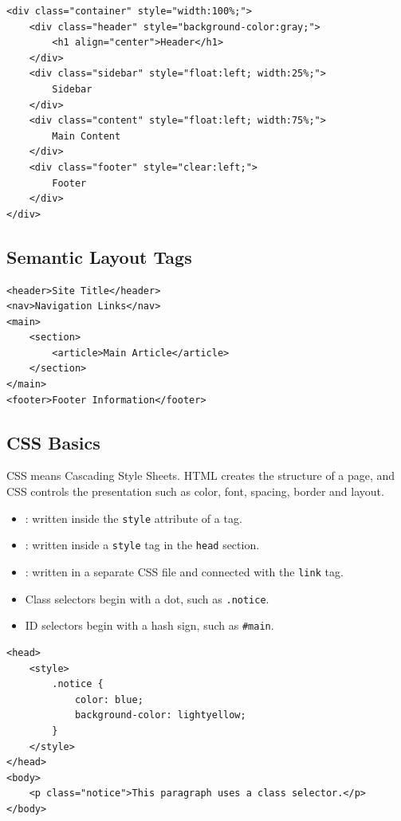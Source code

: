 \begin{lstlisting}[style=htmlide, caption={Simple Div Layout}]
<div class="container" style="width:100%;">
    <div class="header" style="background-color:gray;">
        <h1 align="center">Header</h1>
    </div>
    <div class="sidebar" style="float:left; width:25%;">
        Sidebar
    </div>
    <div class="content" style="float:left; width:75%;">
        Main Content
    </div>
    <div class="footer" style="clear:left;">
        Footer
    </div>
</div>
\end{lstlisting}

\subsection{Semantic Layout Tags}
\begin{lstlisting}[style=htmlide, caption={Semantic Layout}]
<header>Site Title</header>
<nav>Navigation Links</nav>
<main>
    <section>
        <article>Main Article</article>
    </section>
</main>
<footer>Footer Information</footer>
\end{lstlisting}

\subsection{CSS Basics}
CSS means Cascading Style Sheets. HTML creates the structure of a page, and CSS controls the presentation such as color, font, spacing, border and layout.

\begin{itemize}
    \item {}: written inside the \texttt{style} attribute of a tag.
    \item {}: written inside a \texttt{style} tag in the \texttt{head} section.
    \item {}: written in a separate CSS file and connected with the \texttt{link} tag.
    \item Class selectors begin with a dot, such as \texttt{.notice}.
    \item ID selectors begin with a hash sign, such as \texttt{\#main}.
\end{itemize}

\begin{lstlisting}[style=htmlide, caption={Internal CSS and Class Selector}]
<head>
    <style>
        .notice {
            color: blue;
            background-color: lightyellow;
        }
    </style>
</head>
<body>
    <p class="notice">This paragraph uses a class selector.</p>
</body>
\end{lstlisting}

